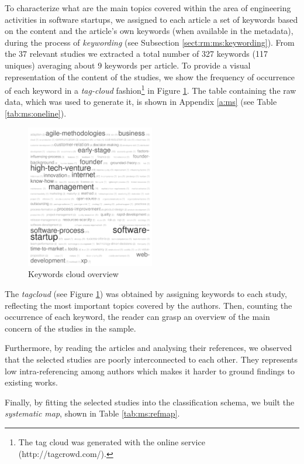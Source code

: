 \documentclass[final,5p,times,twocolumn]{elsarticle}
\begin{document}
To characterize what are the main topics covered within the area of engineering activities in software startups, we assigned to each article a set of keywords based on the content and the article’s own keywords (when available in the metadata), during the process of  \textit{keywording} (see Subsection \ref{sect:rm:ms:keywording}). From the 37 relevant studies we extracted a total number of 327 keywords (117 uniques) averaging about 9 keywords per article. To provide a visual representation of the content of the studies, we show the frequency of occurrence of each keyword in a \textit{tag-cloud} fashion\footnote{The tag cloud was generated with the online service (http://tagcrowd.com/).} in Figure \ref{fig:ms:cloud}. The table containing the raw data, which was used to generate it, is shown in Appendix \ref{a:ms} (see Table \ref{tab:ms:oneline}).

\begin{figure}[H]
\centering
\includegraphics[width=0.5\textwidth,keepaspectratio=true]{figures/cloud.png}
\caption{Keywords cloud overview}
\label{fig:ms:cloud}
\end{figure}

The \textit{tagcloud} (see Figure \ref{fig:ms:cloud}) was obtained by assigning keywords to each study, reflecting the most important topics covered by the authors. Then, counting the occurrence of each keyword, the reader can grasp an overview of the main concern of the studies in the sample.

Furthermore, by reading the articles and analysing their references, we observed that the selected studies are poorly interconnected to each other. They represents low intra-referencing among authors which makes it harder to ground findings to existing works.	

Finally, by fitting the selected studies into the classification schema, we built the \textit{systematic map}, shown in Table \ref{tab:ms:refmap}.
\end{document}
